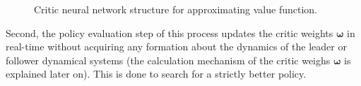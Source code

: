 \documentclass[conference]{IEEEtran}
\begin{document}
\begin{figure}
{\begin{adjustbox}{max width = 0.45\textwidth}
        \end{adjustbox}      
    }
    \caption{Critic neural network structure for approximating value function.}
    \label{fig:nnCritic}
      \end{figure}
 Second, the policy evaluation step of this process updates the critic weights $\bm{\omega}$ in real-time without acquiring any formation about the dynamics of the leader or follower dynamical systems  (the calculation mechanism of the critic weighs $\boldsymbol{\omega}$ is explained later on). This is done to search for a strictly better policy. %
\end{document}
